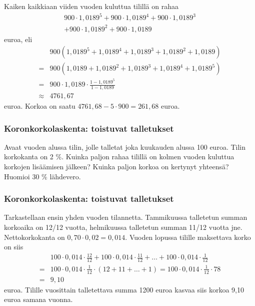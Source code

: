 \documentclass{beamer}
\begin{document}
\begin{frame}
    \begin{ratkaisu}
        Kaiken kaikkiaan viiden vuoden kuluttua tilillä on rahaa
        \begin{multline*}
            900\cdot1,0189^5 + 900\cdot1,0189^4 + 900\cdot1,0189^3\\
             +900\cdot1,0189^2 + 900\cdot1,0189
        \end{multline*}
        euroa, eli\pause
        \begin{align*}
            &900(1,0189^5 + 1,0189^4 + 1,0189^3 + 1,0189^2 + 1,0189)\\
            =&900(1,0189 + 1,0189^2 + 1,0189^3 + 1,0189^4 + 1,0189^5)\\
            =&900\cdot1,0189\cdot\frac{1-1,0189^5}{1-1,0189}\\
            \approx & 4761,67
        \end{align*}
        euroa. \pause Korkoa on saatu \(4761,68-5\cdot900 = 261,68\) euroa.
    \end{ratkaisu}
\end{frame}

\begin{frame}
    \frametitle{Koronkorkolaskenta: toistuvat talletukset}
    \pause
    \begin{esim}
        Avaat vuoden alussa tilin, jolle talletat joka kuukauden alussa 100 euroa.
        Tilin korkokanta on 2 \%. Kuinka paljon rahaa tilillä on kolmen vuoden kuluttua korkojen lisäämisen jälkeen?
        Kuinka paljon korkoa on kertynyt yhteensä? Huomioi 30 \% lähdevero.
    \end{esim}
\end{frame}

\begin{frame}
    \frametitle{Koronkorkolaskenta: toistuvat talletukset}
    \pause
    \begin{ratkaisu}
        Tarkastellaan ensin yhden vuoden tilannetta. Tammikuussa talletetun summan korkoaika on 12/12 vuotta, helmikuussa
        talletetun summan 11/12 vuotta jne. Nettokorkokanta on \(0,70\cdot 0,02 = 0,014\).
        Vuoden lopussa tilille maksettava korko on siis \pause
        \begin{align*}
             &100\cdot0,014\cdot\frac{12}{12} + 100\cdot0,014\cdot\frac{11}{12} + \ldots + 100\cdot0,014\cdot\frac{1}{12}\\
            =&100\cdot0,014\cdot\frac{1}{12}\cdot(12+11+\ldots+1) = 100\cdot0,014\cdot\frac{1}{12}\cdot78\\
            =&9,10
        \end{align*}
        euroa. Tilille vuosittain talletettava summa 1200 euroa kasvaa siis korkoa 9,10 euroa samana vuonna.
    \end{ratkaisu}
\end{frame}
\end{document}
